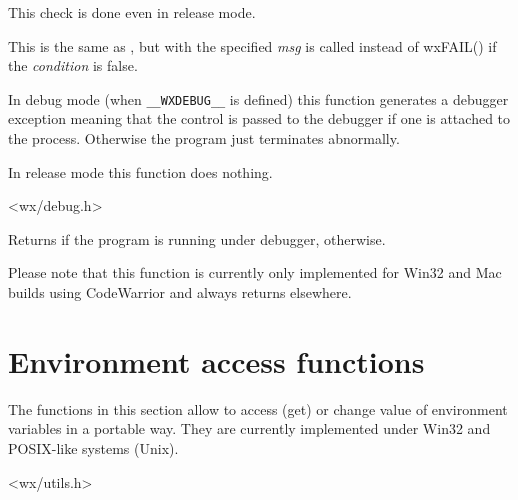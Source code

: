 This check is done even in release mode.


\label{wxcheck2msg}


This is the same as , but
 with the specified {\it msg} is called
instead of wxFAIL() if the {\it condition} is false.


\label{wxtrap}


In debug mode (when {\tt \_\_WXDEBUG\_\_} is defined) this function generates a
debugger exception meaning that the control is passed to the debugger if one is
attached to the process. Otherwise the program just terminates abnormally.

In release mode this function does nothing.


<wx/debug.h>



\label{wxisdebuggerrunning}


Returns \true if the program is running under debugger, \false otherwise.

Please note that this function is currently only implemented for Win32 and Mac
builds using CodeWarrior and always returns \false elsewhere.




\section{Environment access functions}\label{environfunctions}

The functions in this section allow to access (get) or change value of
environment variables in a portable way. They are currently implemented under
Win32 and POSIX-like systems (Unix).



<wx/utils.h>


\label{wxgetenvmacro}


